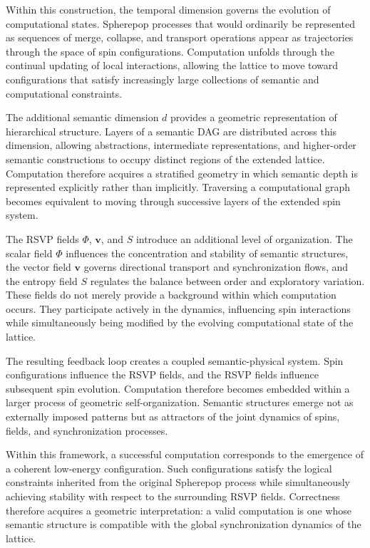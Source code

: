 \documentclass[12pt,letterpaper]{article}
\theoremstyle{remark}
\begin{document}
Within this construction, the temporal dimension governs the evolution of computational states. Spherepop processes that would ordinarily be represented as sequences of merge, collapse, and transport operations appear as trajectories through the space of spin configurations. Computation unfolds through the continual updating of local interactions, allowing the lattice to move toward configurations that satisfy increasingly large collections of semantic and computational constraints.

The additional semantic dimension $d$ provides a geometric representation of hierarchical structure. Layers of a semantic DAG are distributed across this dimension, allowing abstractions, intermediate representations, and higher-order semantic constructions to occupy distinct regions of the extended lattice. Computation therefore acquires a stratified geometry in which semantic depth is represented explicitly rather than implicitly. Traversing a computational graph becomes equivalent to moving through successive layers of the extended spin system.

The RSVP fields $\Phi$, $\mathbf{v}$, and $S$ introduce an additional level of organization. The scalar field $\Phi$ influences the concentration and stability of semantic structures, the vector field $\mathbf{v}$ governs directional transport and synchronization flows, and the entropy field $S$ regulates the balance between order and exploratory variation. These fields do not merely provide a background within which computation occurs. They participate actively in the dynamics, influencing spin interactions while simultaneously being modified by the evolving computational state of the lattice.

The resulting feedback loop creates a coupled semantic-physical system. Spin configurations influence the RSVP fields, and the RSVP fields influence subsequent spin evolution. Computation therefore becomes embedded within a larger process of geometric self-organization. Semantic structures emerge not as externally imposed patterns but as attractors of the joint dynamics of spins, fields, and synchronization processes.

Within this framework, a successful computation corresponds to the emergence of a coherent low-energy configuration. Such configurations satisfy the logical constraints inherited from the original Spherepop process while simultaneously achieving stability with respect to the surrounding RSVP fields. Correctness therefore acquires a geometric interpretation: a valid computation is one whose semantic structure is compatible with the global synchronization dynamics of the lattice.
\end{document}
